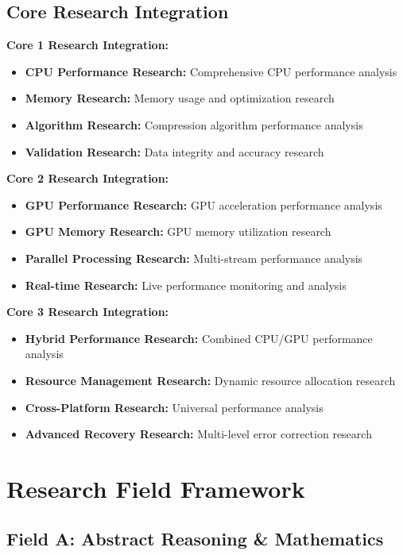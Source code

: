 \documentclass[12pt,a4paper]{article}
\begin{document}
\subsection{Core Research Integration}

\textbf{Core 1 Research Integration:}
\begin{itemize}
    \item \textbf{CPU Performance Research:} Comprehensive CPU performance analysis
    \item \textbf{Memory Research:} Memory usage and optimization research
    \item \textbf{Algorithm Research:} Compression algorithm performance analysis
    \item \textbf{Validation Research:} Data integrity and accuracy research
\end{itemize}

\textbf{Core 2 Research Integration:}
\begin{itemize}
    \item \textbf{GPU Performance Research:} GPU acceleration performance analysis
    \item \textbf{GPU Memory Research:} GPU memory utilization research
    \item \textbf{Parallel Processing Research:} Multi-stream performance analysis
    \item \textbf{Real-time Research:} Live performance monitoring and analysis
\end{itemize}

\textbf{Core 3 Research Integration:}
\begin{itemize}
    \item \textbf{Hybrid Performance Research:} Combined CPU/GPU performance analysis
    \item \textbf{Resource Management Research:} Dynamic resource allocation research
    \item \textbf{Cross-Platform Research:} Universal performance analysis
    \item \textbf{Advanced Recovery Research:} Multi-level error correction research
\end{itemize}

\section{Research Field Framework}

\subsection{Field A: Abstract Reasoning \& Mathematics}
\end{document}
